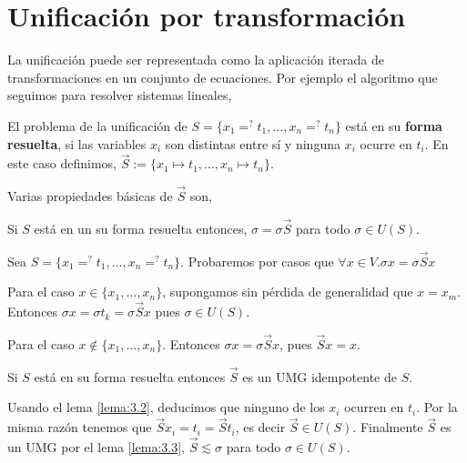 \section{Unificación por transformación}

La unificación puede ser representada como la aplicación iterada de
transformaciones en un conjunto de ecuaciones. Por ejemplo el
algoritmo que seguimos para resolver sistemas lineales,


\begin{defi}
  El problema de la unificación de 
  $S = \{ x_1 =^? t_1, \dots, x_n =^? t_n \}$ 
  está en su \textbf{forma resuelta}, si las variables $x_i$ son distintas
  entre sí y ninguna $x_i$ ocurre en $t_i$. En este caso definimos, 
  $\vec{S} := \{x_1 \mapsto t_1, \dots, x_n \mapsto t_n \}$.
\end{defi}

Varias propiedades básicas de $\vec{S}$ son,

\begin{lema} \label{lema:3.3}
  Si $S$ está en un su forma resuelta entonces, 
  $\sigma = \sigma \vec{S}$ 
  para todo $\sigma \in U(S)$.
\end{lema}

\begin{demo}
  Sea $S = \{ x_1 =^? t_1, \dots, x_n =^? t_n \}$. Probaremos por
  casos que $\forall x \in V. \sigma x = \sigma \vec{S} x$

  Para el caso $x \in \{x_1, \dots, x_n \}$, supongamos sin pérdida de
  generalidad que $x = x_m$. Entonces
  $\sigma x = \sigma t_k = \sigma \vec{S} x$ pues $\sigma \in U(S)$.

  Para el caso $x \not \in \{x_1, \dots, x_n \}$. Entonces
  $\sigma x = \sigma \vec{S} x$, pues $\vec{S} x = x$.
\end{demo}

\begin{lema}
  Si $S$ está en su forma resuelta entonces $\vec{S}$ es un UMG
  idempotente de $S$.
\end{lema}

\begin{demo}
  Usando el lema \ref{lema:3.2}, deducimos que ninguno de los $x_i$
  ocurren en $t_i$. Por la misma razón tenemos que
  $\vec{S} x_i = t_i = \vec{S} t_i$, es decir $\vec{S} \in U(S)$.
  Finalmente $\vec{S}$ es un UMG por el lema \ref{lema:3.3},
  $\vec{S} \lesssim \sigma$ para todo $\sigma \in U(S)$.
\end{demo}

